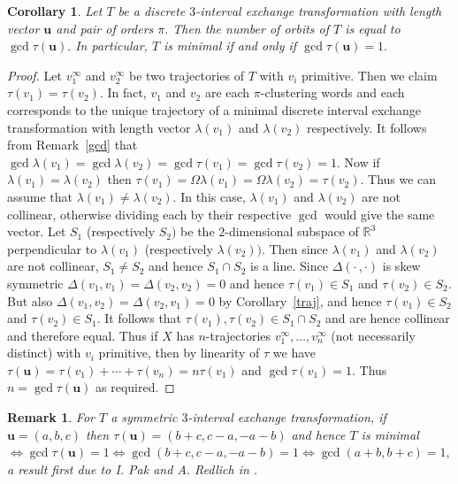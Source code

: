 \documentclass[12pt,a4paper]{amsart}
\newcommand{\reals}{{\mathbb R}}
\newtheorem{corollary}{Corollary}
\newtheorem{remark}{Remark}
\begin{document}
\begin{corollary}\label{3-iet} Let $T$ be a discrete $3$-interval exchange transformation with length vector $\mathbf u$ and pair of orders $\pi.$ Then the number of orbits of $T$ is equal to $\gcd \tau (\mathbf u).$ In particular, $T$ is minimal if and only if $\gcd \tau(\mathbf u)=1.$
\end{corollary}

\begin{proof} Let $v_1^\infty$ and $v_2^\infty$ be  two trajectories of $T$ with $v_i$ primitive. Then we claim $\tau(v_1)=\tau(v_2).$
In fact, $v_1$ and $v_2$ are each $\pi$-clustering words and each corresponds to the unique trajectory of a minimal discrete interval exchange transformation with length vector $\lambda (v_1)$ and $\lambda (v_2)$ respectively. It follows from Remark~\ref{gcd} that $\gcd  \lambda (v_1)=\gcd \lambda (v_2)=\gcd \tau (v_1)=\gcd \tau(v_2)=1.$ 
Now if $\lambda (v_1)=\lambda (v_2)$ then  $\tau(v_1)=\Omega \lambda(v_1)=\Omega \lambda (v_2)=\tau(v_2).$ Thus we can assume that $\lambda (v_1)\neq \lambda (v_2).$ In this case, $\lambda (v_1)$ and $\lambda (v_2)$ are not collinear, otherwise dividing each by their respective $\gcd$ would give the same vector.  Let $S_1$ (respectively $S_2)$ be the $2$-dimensional subspace of $\reals^3$ perpendicular to $\lambda (v_1)$ (respectively $\lambda( v_2)).$ Then since $\lambda (v_1)$ and $ \lambda (v_2)$ are not collinear, $S_1\neq S_2$ and hence $S_1\cap S_2$ is a line. Since $\Delta (\cdot \,, \cdot)$ is skew symmetric $\Delta(v_1,v_1)=\Delta(v_2,v_2)=0$ and hence $\tau(v_1)\in S_1$ and $\tau (v_2)\in S_2.$ But also $\Delta(v_1,v_2)=\Delta(v_2,v_1)=0$ by Corollary~\ref{traj}, and hence $\tau(v_1)\in S_2$ and $\tau(v_2)\in S_1.$ It follows that $\tau (v_1), \tau(v_2) \in S_1 \cap S_2$ and are hence collinear and therefore equal. Thus if $X$ has $n$-trajectories $v_1^\infty,\ldots ,v_n^\infty$ (not necessarily distinct) with $v_i$ primitive, then by linearity of $\tau$ we have $\tau (\mathbf u)=\tau(v_1)+\cdots +\tau(v_n)=n\tau(v_1)$ and $\gcd \tau (v_1)=1.$ Thus $n=\gcd \tau (\mathbf u)$ as required.   \end{proof}

\begin{remark}\label{PakRed}\rm For $T$ a symmetric $3$-interval exchange transformation, if $\mathbf u =(a,b,c)$ then \newline $\tau (\mathbf u)=(b+c,c-a,-a-b)$ and hence $T$ is minimal $\Leftrightarrow\gcd \tau(\mathbf u)=1\Leftrightarrow \gcd (b+c,c-a,-a-b)=1 \Leftrightarrow \gcd(a+b,b+c)=1,$ a result first due to I. Pak and A. Redlich in \cite{PR}.  
\end{remark}
\end{document}
